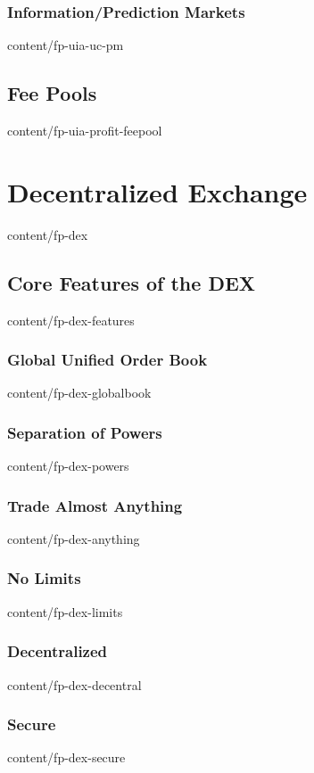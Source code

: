 \documentclass[conference,final,10pt,a4paper]{IEEEtran}
\begin{document}
\subsubsection  { Information/Prediction Markets                   }  { content/fp-uia-uc-pm           } 
\subsection     { Fee Pools                                        }  { content/fp-uia-profit-feepool  } 

\section        { Decentralized Exchange                           }  { content/fp-dex                 } 
\subsection     { Core Features of the DEX                         }  { content/fp-dex-features        } 
\subsubsection  { Global Unified Order Book                        }  { content/fp-dex-globalbook      } 
\subsubsection  { Separation of Powers                             }  { content/fp-dex-powers          } 
\subsubsection  { Trade Almost Anything                            }  { content/fp-dex-anything        } 
\subsubsection  { No Limits                                        }  { content/fp-dex-limits          } 
\subsubsection  { Decentralized                                    }  { content/fp-dex-decentral       } 
\subsubsection  { Secure                                           }  { content/fp-dex-secure          } 
\end{document}
